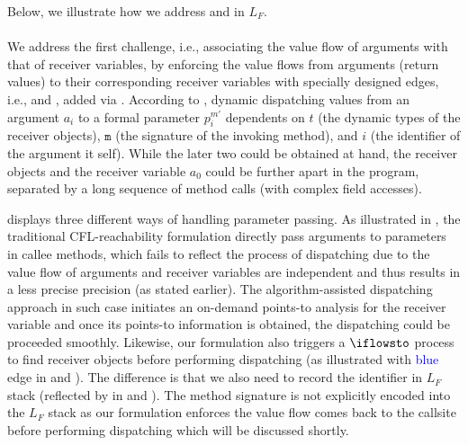 Below, we illustrate how we address  and  in $L_F$.

\paragraph{ } We address the first challenge, i.e., associating the value flow of arguments with that of receiver variables, by enforcing the value flows from arguments (return values) to their corresponding receiver variables with specially designed \pag edges, i.e., \store[i] and , added via . According to , dynamic dispatching values from an argument $a_i$ to a formal parameter $p_i^{m'}$ dependents on $t$ (the dynamic types of the receiver objects), $\texttt{m}$ (the signature of the invoking method), and $i$ (the identifier of the argument it self).   While the later two could be obtained at hand, the receiver objects and the receiver variable $a_0$ could be further apart in the program, separated by a long sequence of method calls (with complex field accesses). 

 displays three different ways of handling parameter
passing. As illustrated in , the traditional CFL-reachability
formulation directly pass arguments to parameters in callee methods,
which fails to reflect the process of dispatching due to the value flow of arguments
and receiver variables are independent and thus results in a less precise precision
(as stated earlier). The algorithm-assisted dispatching approach
\cite{sridharan2005demand, sridharan2006refinement} in such case initiates an
on-demand points-to
analysis for the receiver variable and once its points-to information is obtained, the dispatching
could be proceeded smoothly. Likewise, our formulation also triggers a $\iflowsto$ process to find
receiver objects before performing dispatching (as illustrated with \textcolor{blue}{blue} edge in  and ). The difference is that we also need to record the
identifier in $L_F$ stack (reflected by  in  and
). The method signature is not explicitly encoded into the $L_F$ stack as our
formulation enforces the value flow comes back to the callsite before performing dispatching which
will be discussed shortly. 

